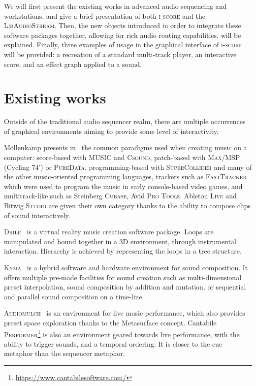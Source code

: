 \documentclass{article}
\newcommand*{\LibAudioStream}{\textsc{LibAudioStream}\xspace}
\newcommand*{\iscore}{\textsc{i-score}\xspace}
\newcommand*{\maxmsp}{\textsc{Max/MSP} (Cycling 74')\xspace}
\newcommand*{\puredata}{\textsc{PureData}\xspace}
\newcommand*{\csound}{\textsc{Csound}\xspace}
\newcommand*{\supercollider}{\textsc{SuperCollider}\xspace}
\newcommand*{\abletonlive}{Ableton \textsc{Live}\xspace}
\newcommand*{\bitwigstudio}{Bitwig \textsc{Studio}\xspace}
\newcommand*{\fasttracker}{\textsc{FastTracker}\xspace}
\newcommand*{\cubase}{Steinberg \textsc{Cubase}\xspace}
\newcommand*{\protools}{Avid \textsc{Pro Tools}\xspace}
\newcommand*{\MUSIC}{\textsc{MUSIC}\xspace}
\newcommand*{\drile}{\textsc{Drile}\xspace}
\newcommand*{\kyma}{\textsc{Kyma}\xspace}
\newcommand*{\audiomulch}{\textsc{Audiomulch}\xspace}
\newcommand*{\cantabileperformer}{Cantabile \textsc{Performer}\xspace}
\begin{document}
We will first present the existing works in advanced audio sequencing and workstations, 
and give a brief presentation of both \iscore and the \LibAudioStream.
Then, the new objects introduced in order to integrate these software packages together, allowing 
for rich audio routing capabilities, will be explained.
Finally, three examples of usage in the graphical interface of \iscore will be provided: a recreation of a standard multi-track player, an interactive score, and an effect graph applied to a sound.

\section{Existing works}
Outside of the traditional audio sequencer realm, there are
multiple occurrences of graphical environments aiming to provide 
some level of interactivity.

M{\"o}llenkamp presents in~\cite{mollenkampparadigms} the 
common paradigms used when creating music on a computer: score-based with \MUSIC and \csound\cite{vercoe1990real}, 
patch-based with \maxmsp or \puredata\cite{puckette1996pure}, programming-based with \supercollider\cite{mccartney2002rethinking} and many of the other music-oriented programming languages, trackers such as \fasttracker which were used to program the music in early console-based video games, and multitrack-like such as \cubase, \protools.
\abletonlive and \bitwigstudio are given their own category thanks to the ability to compose clips of sound interactively.

\drile~\cite{berthaut2010drile} is a virtual reality music creation software package. 
Loops are manipulated and bound together in a 3D environment, through instrumental interaction. 
Hierarchy is achieved by representing the loops in a tree structure.

\kyma~\cite{scaletti1989kyma} is a hybrid software and hardware environment for sound composition. 
It offers multiple pre-made facilities for sound creation such as multi-dimensional preset interpolation, sound composition by addition and mutation, or sequential and parallel sound composition on a time-line.

\audiomulch~\cite{bencina2005metasurface} is an environment for live music performance, which also provides preset space exploration thanks to the Metasurface concept. 
\cantabileperformer\footnote{\url{https://www.cantabilesoftware.com/}} is also an environment geared towards live performance, with the ability to trigger sounds, and a temporal ordering. It is closer to the cue metaphor than the sequencer metaphor.
\end{document}

